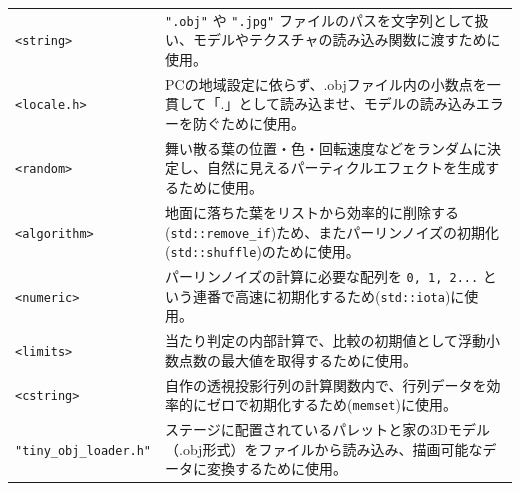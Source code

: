\documentclass[upIatex,dvipdfmx,a4paper]{jsarticle}
\begin{document}
\begin{table}[H]
\begin{tabular}{lp{10cm}}
    \texttt{<string>} & \texttt{".obj"} や \texttt{".jpg"} ファイルのパスを文字列として扱い、モデルやテクスチャの読み込み関数に渡すために使用。 \\ \addlinespace

    \texttt{<locale.h>} & PCの地域設定に依らず、.objファイル内の小数点を一貫して「.」として読み込ませ、モデルの読み込みエラーを防ぐために使用。 \\ \addlinespace

    \texttt{<random>} & 舞い散る葉の位置・色・回転速度などをランダムに決定し、自然に見えるパーティクルエフェクトを生成するために使用。 \\ \addlinespace

    \texttt{<algorithm>} & 地面に落ちた葉をリストから効率的に削除する(\texttt{std::remove\_if})ため、またパーリンノイズの初期化(\texttt{std::shuffle})のために使用。 \\ \addlinespace

    \texttt{<numeric>} & パーリンノイズの計算に必要な配列を \texttt{0, 1, 2...} という連番で高速に初期化するため(\texttt{std::iota})に使用。 \\ \addlinespace

    \texttt{<limits>} & 当たり判定の内部計算で、比較の初期値として浮動小数点数の最大値を取得するために使用。 \\ \addlinespace

    \texttt{<cstring>} & 自作の透視投影行列の計算関数内で、行列データを効率的にゼロで初期化するため(\texttt{memset})に使用。 \\ \addlinespace

    \texttt{"tiny\_obj\_loader.h"} & ステージに配置されているパレットと家の3Dモデル（.obj形式）をファイルから読み込み、描画可能なデータに変換するために使用。 \\
    \bottomrule
    \end{tabular}
\end{table}
\end{document}
